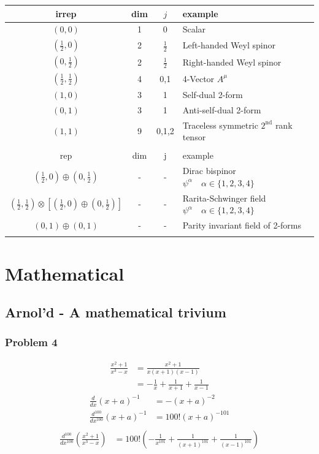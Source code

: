 \documentclass[10pt,a4paper]{article}
\theoremstyle{definition}
\begin{document}
\begin{center}
 \begin{tabular}{c c c l} 
 \hline
 irrep & dim & $j$ & example \\ [0.5ex] 
 \hline\hline
 $(0,0)$                        & 1 & 0 & Scalar \\  [0.5ex]
 $(\frac{1}{2},0)$              & 2 & $\frac{1}{2}$ & Left-handed Weyl spinor \\  [0.5ex]
 $(0,\frac{1}{2})$              & 2 & $\frac{1}{2}$ & Right-handed Weyl spinor \\  [0.5ex]
 $(\frac{1}{2},\frac{1}{2})$    & 4 & 0,1 & 4-Vector $A^\mu$ \\  [0.5ex]
 $(1,0)$                        & 3 & 1 & Self-dual 2-form \\  [0.5ex]
 $(0,1)$                        & 3 & 1 & Anti-self-dual 2-form \\  [0.5ex]
 $(1,1)$                        & 9 & 0,1,2 & Traceless symmetric $2^\text{nd}$ rank tensor \\ \hline  \\ [0.5ex]
  \hline
 rep & dim & j & example \\ [0.5ex] 
 \hline\hline
 $(\frac{1}{2},0)\oplus(0,\frac{1}{2})$& - & - & Dirac bispinor $\psi^\alpha\quad \alpha\in\{1,2,3,4\}$ \\  [0.5ex]
 $(\frac{1}{2},\frac{1}{2})\otimes\left[(\frac{1}{2},0)\oplus(0,\frac{1}{2})\right]$& - & - & Rarita-Schwinger field $\psi^\alpha\quad \alpha\in\{1,2,3,4\}$ \\  [0.5ex]
  $(0,1)\oplus(0,1)$& - & - & Parity invariant field of 2-forms\\ \hline \\ [0.5ex]
\end{tabular}
\end{center}



\newpage
\section{Mathematical}
\subsection{{\sc Arnol'd} - A mathematical trivium}
\subsubsection{Problem 4}
\begin{align}
    \frac{x^2+1}{x^3-x}&=\frac{x^2+1}{x(x+1)(x-1)}\\
    &=-\frac{1}{x}+\frac{1}{x+1}+\frac{1}{x-1}
\end{align}
\begin{align}
    \frac{d}{dx}(x+a)^{-1}&=-(x+a)^{-2}\\
    \frac{d^{100}}{dx^{100}}(x+a)^{-1}&=100!(x+a)^{-101}\\
\end{align}
\begin{align}
    \frac{d^{100}}{dx^{100}}\left(\frac{x^2+1}{x^3-x}\right)&=100!\left(-\frac{1}{x^{101}}+\frac{1}{(x+1)^{101}}+\frac{1}{(x-1)^{101}}\right)
\end{align}
\end{document}
